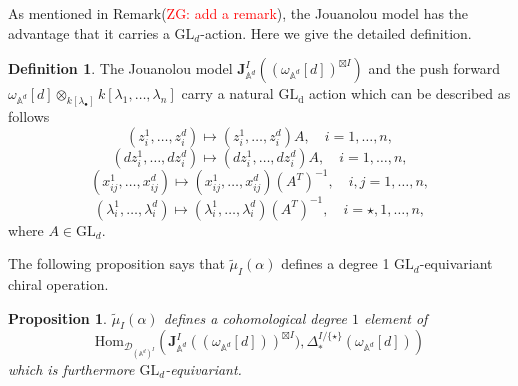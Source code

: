 \documentclass[11pt]{amsart}
\newtheorem{prop}[thm]{Proposition}
\theoremstyle{definition}
\newtheorem{defn}[thm]{Definition}
\theoremstyle{remark}
\numberwithin{equation}{section}
\newcommand{\Gui}[1]{(\textcolor{red}{ZG: #1})}
\begin{document}
As mentioned in Remark\Gui{add a remark}, the Jouanolou model has the advantage that it carries a $\mathrm{GL}_d$-action. Here we give the detailed definition. 
\begin{defn}
   The Jouanolou model $ \mathbf{J}^{ I}_{\mathbb{A}^{d}}((\omega_{\mathbb{A}^{d}}[d])^{\boxtimes I})$ and the push forward $\omega_{\mathbb{A}^{d}}[d]\otimes_{k[\lambda_{\bullet}]}k[\lambda_{1},\dots,\lambda_{n}]$ carry a natural $\mathrm{GL_d}$ action which can be described as follows
   $$
   (z^1_i,\dots,z^d_i)\mapsto  (z^1_i,\dots,z^d_i)A,\quad i=1,\dots,n,
   $$
    $$
   (dz^1_i,\dots,dz^d_i)\mapsto  (dz^1_i,\dots,dz^d_i)A,\quad i=1,\dots,n,
   $$
    $$
   (x^1_{ij},\dots,x^d_{ij})\mapsto  (x^1_{ij},\dots,x^d_{ij})(A^{T})^{-1},\quad i,j=1,\dots,n,
   $$
 $$
   (\lambda^1_i,\dots,\lambda^d_i)\mapsto  (\lambda^1_i,\dots,\lambda^d_i)(A^{T})^{-1},\quad i=\star,1,\dots,n,
   $$
   where $A\in \mathrm{GL}_d$.
\end{defn}
The following proposition says that $\tilde{\mu}_{ I}(\alpha)$ defines a degree 1 $\mathrm{GL}_d$-equivariant chiral operation.
\begin{prop}
    $\tilde{\mu}_{ I}(\alpha)$ defines a cohomological degree $1$ element of
    \[
      \mathrm{Hom}_{\mathcal{D}_{(\mathbb{A}^d)^{I}}}\left(\mathbf{J}_{\mathbb{A}^d}^{I}((\omega_{\mathbb{A}^{d}}[d]))^{\boxtimes I}),\Delta^{I/\{\star\}}_*(\omega_{\mathbb{A}^{d}}[d])\right)
    \]
which is furthermore $\mathrm{GL}_d$-equivariant.
\end{prop}
\end{document}
